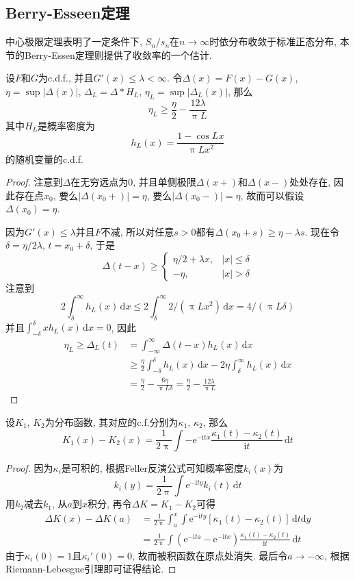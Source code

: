 \documentclass[cn, 12pt, math=mtpro2, bibstyle=apa, blue, twocol]{elegantbook}
\begin{document}
\subsection{Berry-Esseen定理}
中心极限定理表明了一定条件下, $S_n/s_n$在$n\to\infty$时依分布收敛于标准正态分布, 本节的Berry-Essen定理则提供了收敛率的一个估计.
\begin{lemma}\label{lem:lem3.8}
设$F$和$G$为c.d.f., 并且$G'(x)\leq\lambda<\infty$. 令$\Delta(x)=F(x)-G(x)$, $\eta=\sup|\Delta(x)|$, $\Delta_L=\Delta\ast H_L$, $\eta_L=\sup|\Delta_L(x)|$, 那么
$$\eta_L\geq \frac{\eta}{2}-\frac{12\lambda}{\uppi L}$$
其中$H_L$是概率密度为
$$h_L(x)=\frac{1-\cos Lx}{\uppi Lx^2}$$
的随机变量的c.d.f.
\end{lemma}
\begin{proof}
  注意到$\Delta$在无穷远点为0, 并且单侧极限$\Delta(x+)$和$\Delta(x-)$处处存在, 因此存在点$x_0$, 要么$|\Delta(x_0+)|=\eta$, 要么$|\Delta(x_0-)|=\eta$, 故而可以假设$\Delta(x_0)=\eta$.

  因为$G'(x)\leq\lambda$并且$F$不减, 所以对任意$s>0$都有$\Delta(x_0+s)\geq \eta-\lambda s$. 现在令$\delta=\eta/2\lambda$, $t=x_0+\delta$, 于是
  $$\Delta(t-x)\ge\begin{cases}
                  \eta/2+\lambda x, & |x|\leq\delta \\
                  -\eta, & |x|>\delta
                \end{cases}$$
  注意到
  $$2\int_{\delta}^{\infty}h_L(x)\,\text{d}x\leq 2\int_{\delta}^{\infty}2/(\uppi Lx^2)\,\text{d}x=4/(\uppi L\delta)$$
  并且$\int_{-\delta}^{\delta}xh_L(x)\,\text{d}x=0$, 因此
  \begin{align*}
  \eta_L\geq\Delta_L(t)&=\int_{-\infty}^{\infty}\Delta(t-x)h_L(x)\,\text{d}x \\
  &\geq \frac{\eta}{2}\int_{-\delta}^{\delta}h_L(x)\,\text{d}x-2\eta\int_{\delta}^{\infty}h_L(x)\,\text{d}x \\
  &=\frac{\eta}{2}-\frac{6\eta}{\uppi L\delta}=\frac{\eta}{2}-\frac{12\lambda}{\uppi L}
  \end{align*}
\end{proof}
\begin{lemma}\label{lem:lem3.9}
设$K_1$, $K_2$为分布函数, 其对应的c.f.分别为$\kappa_1$, $\kappa_2$, 那么
$$K_1(x)-K_2(x)=\frac{1}{2\uppi}\int -\text{e}^{-\text{i}tx}\frac{\kappa_1(t)-\kappa_2(t)}{\text{i}t}\,\text{d}t$$
\end{lemma}
\begin{proof}
  因为$\kappa_i$是可积的, 根据Feller反演公式可知概率密度$k_i(x)$为
  $$k_i(y)=\frac{1}{2\uppi}\int\text{e}^{-\text{i}ty}k_i(t)\,\text{d}t$$
  用$k_2$减去$k_1$, 从$a$到$x$积分, 再令$\Delta K=K_1-K_2$可得
  \begin{align*}
  \Delta K(x)-\Delta K(a)&=\frac{1}{2\uppi}\int_{a}^{x}\int\text{e}^{-\text{i}ty}[\kappa_1(t)-\kappa_2(t)]\,\text{d}t\text{d}y \\
  &=\frac{1}{2\uppi}\int(\text{e}^{-\text{i}ta}-\text{e}^{-\text{i}tx})\frac{\kappa_1(t)-\kappa_2(t)}{\text{i}t}\,\text{d}t
  \end{align*}
  由于$\kappa_i(0)=1$且$\kappa_i'(0)=0$, 故而被积函数在原点处消失. 最后令$a\to-\infty$, 根据Riemann-Lebesgue引理即可证得结论.
\end{proof}
\end{document}
